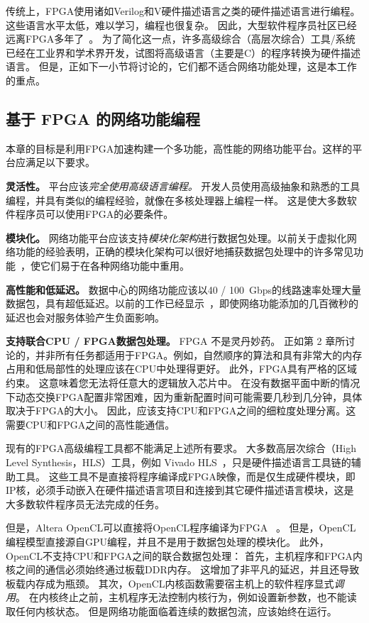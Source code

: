 传统上，FPGA使用诸如Verilog和V硬件描述语言之类的硬件描述语言进行编程。
这些语言水平太低，难以学习，编程也很复杂。
因此，大型软件程序员社区已经远离FPGA多年了~\cite {bacon2013fpga}。
为了简化这一点，许多高级综合（高层次综合）工具/系统已经在工业界和学术界开发，试图将高级语言（主要是C）的程序转换为硬件描述语言。
但是，正如下一小节将讨论的，它们都不适合网络功能处理，这是本工作的重点。

\subsection{基于 FPGA 的网络功能编程}

本章的目标是利用FPGA加速构建一个多功能，高性能的网络功能平台。这样的平台应满足以下要求。

\textbf {灵活性。} 平台应该\textit {完全使用高级语言编程。}
开发人员使用高级抽象和熟悉的工具编程，并具有类似的编程经验，就像在多核处理器上编程一样。
这是使大多数软件程序员可以使用FPGA的必要条件。

\textbf {模块化。} 网络功能平台应该支持\textit {模块化架构}进行数据包处理。以前关于虚拟化网络功能的经验表明，正确的模块化架构可以很好地捕获数据包处理中的许多常见功能~\cite {kohler2000click,martins2014clickos}，使它们易于在各种网络功能中重用。

\textbf {高性能和低延迟。} 数据中心的网络功能应该以40 / 100~Gbps的线路速率处理大量数据包，具有超低延迟。以前的工作已经显示~\cite {rollback-mb}，即使网络功能添加的几百微秒的延迟也会对服务体验产生负面影响。

\textbf {支持联合CPU / FPGA数据包处理。} FPGA 不是灵丹妙药。
正如第 2 章所讨论的，并非所有任务都适用于FPGA。例如，自然顺序的算法和具有非常大的内存占用和低局部性的处理应该在CPU中处理得更好。
此外，FPGA具有严格的区域约束。
这意味着您无法将任意大的逻辑放入芯片中。
在没有数据平面中断的情况下动态交换FPGA配置非常困难，因为重新配置时间可能需要几秒到几分钟，具体取决于FPGA的大小。
因此，应该支持CPU和FPGA之间的细粒度处理分离。这需要CPU和FPGA之间的高性能通信。


现有的FPGA高级编程工具都不能满足上述所有要求。
大多数高层次综合（High Level Synthesis，HLS）工具，例如 Vivado HLS~\cite{vivado}，只是硬件描述语言工具链的辅助工具。
这些工具不是直接将程序编译成FPGA映像，而是仅生成硬件模块，即IP核，必须手动嵌入在硬件描述语言项目和连接到其它硬件描述语言模块，这是大多数软件程序员无法完成的任务。

但是，Altera OpenCL可以直接将OpenCL程序编译为FPGA~ \cite {aoc}。
但是，OpenCL编程模型直接源自GPU编程，并且不是用于数据包处理的模块化。
此外，OpenCL不支持CPU和FPGA之间的联合数据包处理：
首先，主机程序和FPGA内核之间的通信必须始终通过板载DDR内存。 这增加了非平凡的延迟，并且还导致板载内存成为瓶颈。
其次，OpenCL内核函数需要宿主机上的软件程序显式\textit {调用}。
在内核终止之前，主机程序无法控制内核行为，例如设置新参数，也不能读取任何内核状态。
但是网络功能面临着连续的数据包流，应该始终在运行。

